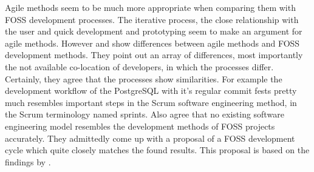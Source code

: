 Agile methods seem to be much more appropriate when comparing them with
\ac{FOSS} development processes. The iterative process, the close relationship
with the user and quick development and prototyping seem to make an argument
for agile methods. However \textcite{Warsta2003} and \textcite{Koch2004} show
differences between agile methods and \ac{FOSS} development methods. They point
out an array of differences, most importantly the not available co-location of
developers, in which the processes differ. Certainly, they agree that the
processes show similarities. For example the development workflow of the
PostgreSQL with it's regular commit fests pretty much resembles important steps
in the Scrum software engineering method, in the Scrum terminology named
sprints. Also \textcite{Roets2007} agree that no existing software engineering
model resembles the development methods of \ac{FOSS} projects accurately. They
admittedly come up with a proposal of a \ac{FOSS} development cycle which quite
closely matches the found results. This proposal is based on the findings by
\textcite{Jorgensen2001}.


